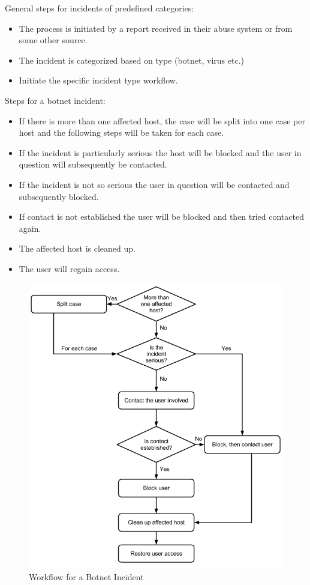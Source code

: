 General steps for incidents of predefined categories:
\begin{itemize}\itemsep-0.2cm
\item The process is initiated by a report received in their abuse system or from some other source. 
\item The incident is categorized based on type (botnet, virus etc.)
\item Initiate the specific incident type workflow.
\end{itemize}

Steps for a botnet incident:
\begin{itemize}\itemsep-0.2cm
\item If there is more than one affected host, the case will be split into one case per host and the following steps will be taken for each case.
\item If the incident is particularly serious the host will be blocked and the user in question will subsequently be contacted.
\item If the incident is not so serious the user in question will be contacted and subsequently blocked.
\item If contact is not established the user will be blocked and then tried contacted again.
\item The affected host is cleaned up.
\item The user will regain access.
\end{itemize}

\begin{figure}[H]
\begin{center}
\includegraphics[scale=0.53]{WorkflowCaseABotnet.png}
\caption[Workflow for a Botnet Incident, Case A]{Workflow for a Botnet Incident}
\label{fig:WorkflowCaseABotnet}
\end{center}
\end{figure}

